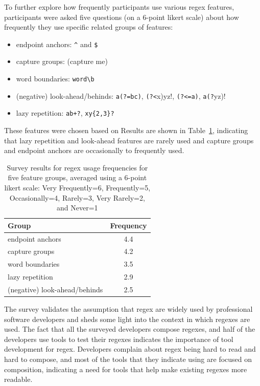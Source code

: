 To further explore how frequently participants use various regex features, participants were asked five questions (on a 6-point likert scale) about how frequently they use specific related groups of features:
\begin{itemize} \itemsep -2pt
    \item endpoint anchors: \verb!^! and \verb!$!
    \item capture groups: (capture me)
    \item word boundaries: \verb!word\b!
    \item (negative) look-ahead/behinds: \verb!a(?=bc)!, \verb!(?<!x)yz!, \verb!(?<=a)!, \verb!a(?!yz)!
    \item lazy repetition: \verb!ab+?!, \verb!xy{2,3}?!
\end{itemize}
These features were chosen based on 
Results are shown in Table~\ref{tab:regexfeaturegroups}, indicating that lazy repetition and look-ahead features are rarely used and capture groups and endpoint anchors are occasionally to frequently used. 

\begin{table}
\caption{Survey results for regex usage frequencies for five feature groups, averaged using a 6-point likert scale: Very Frequently=6, Frequently=5, Occasionally=4, Rarely=3, Very Rarely=2, and Never=1 \label{tab:regexfeaturegroups}}
\begin{center}
\begin{tabular}{l|c}
Group & Frequency \\ \hline
endpoint anchors & 4.4\\
capture groups & 4.2 \\
word boundaries & 3.5 \\
lazy repetition & 2.9\\
(negative) look-ahead/behinds & 2.5\\


\end{tabular}
\end{center}
\end{table}

The survey validates the assumption that regex are widely used by professional software developers and sheds some light into the context in which regexes are used. 
The fact that all the surveyed developers compose regexes, and half of the developers use tools to test their regexes indicates the importance of tool development for regex.  Developers complain about regex being hard to read and hard to compose, and most of the tools that they indicate using are focused on composition, indicating a need for tools that help make existing regexes more readable.


